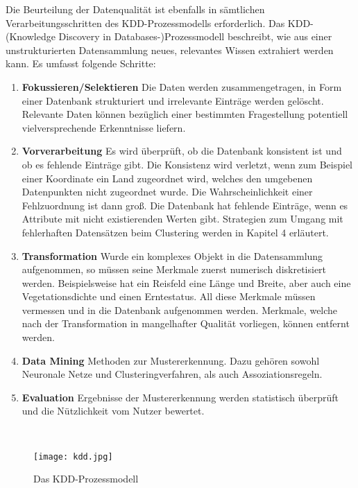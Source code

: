 \documentclass[11pt,ceqn]{book}
\begin{document}
Die Beurteilung der Datenqualität ist ebenfalls in sämtlichen Verarbeitungsschritten des KDD-Prozessmodells \cite{kddmod} erforderlich. Das KDD-(Knowledge Discovery in Databases-)Prozessmodell beschreibt, wie aus einer unstrukturierten Datensammlung neues, relevantes Wissen extrahiert werden kann. Es umfasst folgende Schritte:
\begin{enumerate}
\item \textbf{Fokussieren/Selektieren} Die Daten werden zusammengetragen, in Form einer Datenbank strukturiert und irrelevante Einträge werden gelöscht. Relevante Daten können bezüglich einer bestimmten Fragestellung potentiell vielversprechende Erkenntnisse liefern.
\item \textbf{Vorverarbeitung} Es wird überprüft, ob die Datenbank konsistent ist und ob es fehlende Einträge gibt. Die Konsistenz wird verletzt, wenn zum Beispiel einer Koordinate ein Land zugeordnet wird, welches den umgebenen Datenpunkten nicht zugeordnet wurde. Die Wahrscheinlichkeit einer Fehlzuordnung ist dann groß. Die Datenbank hat fehlende Einträge, wenn es Attribute mit nicht existierenden Werten gibt. Strategien zum Umgang mit fehlerhaften Datensätzen beim Clustering werden in Kapitel 4 erläutert.
\item \textbf{Transformation} Wurde ein komplexes Objekt in die Datensammlung aufgenommen, so müssen seine Merkmale zuerst numerisch diskretisiert werden. Beispielsweise hat ein Reisfeld eine Länge und Breite, aber auch eine Vegetationsdichte und einen Erntestatus. All diese Merkmale müssen vermessen und in die Datenbank aufgenommen werden. Merkmale, welche nach der Transformation in mangelhafter Qualität vorliegen, können entfernt werden.
\item \textbf{Data Mining} Methoden zur Mustererkennung. Dazu gehören sowohl Neuronale Netze und Clusteringverfahren, als auch Assoziationsregeln.
\item \textbf{Evaluation} Ergebnisse der Mustererkennung werden statistisch überprüft und die Nützlichkeit vom Nutzer bewertet.
\end{enumerate}~\\


\begin{figure}[H]
\centering
\texttt{[image: kdd.jpg]}
\caption{Das KDD-Prozessmodell \protect\footnotemark}
\end{figure}
\end{document}

